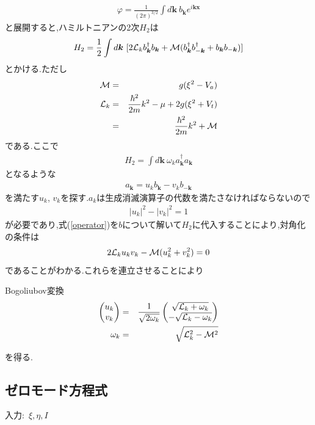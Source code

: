 \documentclass[10.5pt,a4paper]{jreport}
\begin{document}
\begin{eqnarray}
  \varphi = \frac{1}{(2\pi)^{3/2}}\int d\bm{k}\ b_{\bm{k}}e^{i\bm{k}\bm{x}}
\end{eqnarray}
と展開すると,ハミルトニアンの2次$H_2$は
\begin{eqnarray}
  H_2 = \frac{1}{2}\int d\bm{k}\ [2{\cal L}_kb^\dagger_{\bm{k}}b_{\bm{k}} + {\cal M}(b^\dagger_{\bm{k}}b^\dagger_{-\bm{k}} + b_{\bm{k}}b_{-\bm{k}})]
\end{eqnarray}
とかける.ただし
\begin{eqnarray}
  {\cal M} &=& g(\xi^2 - V_a)\\
  \nonumber  {\cal L}_k &=& \frac{\hbar^2}{2m}k^2 - \mu + 2g(\xi^2 + V_t)\\
  &=& \frac{\hbar^2}{2m}k^2 + {\cal M}
\end{eqnarray}
である.ここで
\begin{eqnarray}
  H_2 = \int d\bm{k}\ \omega_ka^\dagger_{\bm k}a_{\bm k}
\end{eqnarray}
となるような
\begin{eqnarray}
  a_{\bm k} = u_kb_{\bm k} - v_kb_{-\bm{k}}\label{operator}
\end{eqnarray}
を満たす$u_k$, $v_k$を探す.$a_k$は生成消滅演算子の代数を満たさなければならないので
\begin{eqnarray}
  |u_k|^2-|v_k|^2=1
\end{eqnarray}
が必要であり,式(\ref{operator})を$b$について解いて$H_2$に代入することにより,対角化の条件は
\begin{eqnarray}
  2{\cal L}_ku_kv_k -{\cal M}(u^2_k + v^2_k) = 0
\end{eqnarray}
であることがわかる.これらを連立させることにより
\begin{itembox}[c]{Bogoliubov変換}
\begin{eqnarray}
  \begin{pmatrix}
      u_k\\
      v_k
    \end{pmatrix}
  &=& \frac{1}{\sqrt{2\omega_k}}
  \begin{pmatrix}
    \sqrt{{\cal L}_k + \omega_k}\\
    -\sqrt{{\cal L}_k - \omega_k}
  \end{pmatrix}\\
  \omega_k &=& \sqrt{{\cal L}^2_k - {\cal M}^2}
\end{eqnarray}
\end{itembox}
を得る.
\subsection{ゼロモード方程式}
入力:\ $\xi, \eta, I$
\end{document}
